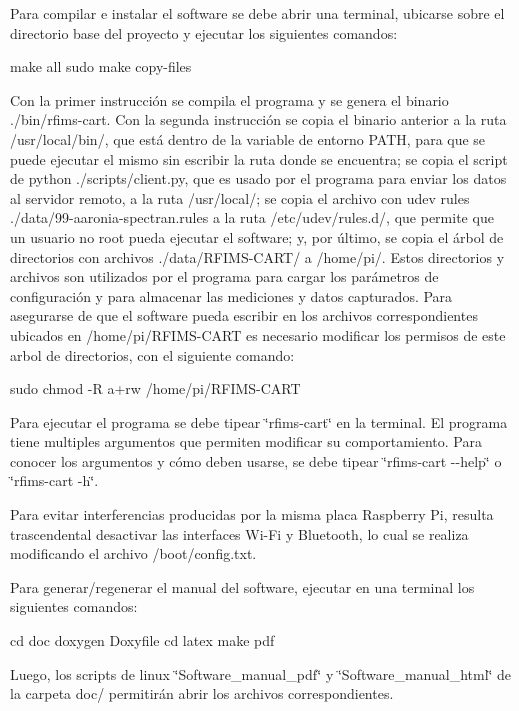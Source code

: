 Para compilar e instalar el software se debe abrir una terminal, ubicarse sobre el directorio base del proyecto y ejecutar los siguientes comandos\+: \begin{DoxyVerb}make all
sudo make copy-files
\end{DoxyVerb}


Con la primer instrucción se compila el programa y se genera el binario ./bin/rfims-\/cart. Con la segunda instrucción se copia el binario anterior a la ruta /usr/local/bin/, que está dentro de la variable de entorno P\+A\+TH, para que se puede ejecutar el mismo sin escribir la ruta donde se encuentra; se copia el script de python ./scripts/client.py, que es usado por el programa para enviar los datos al servidor remoto, a la ruta /usr/local/; se copia el archivo con udev rules ./data/99-\/aaronia-\/spectran.rules a la ruta /etc/udev/rules.d/, que permite que un usuario no root pueda ejecutar el software; y, por último, se copia el árbol de directorios con archivos ./data/\+R\+F\+I\+M\+S-\/\+C\+A\+R\+T/ a /home/pi/. Estos directorios y archivos son utilizados por el programa para cargar los parámetros de configuración y para almacenar las mediciones y datos capturados. Para asegurarse de que el software pueda escribir en los archivos correspondientes ubicados en /home/pi/\+R\+F\+I\+M\+S-\/\+C\+A\+RT es necesario modificar los permisos de este arbol de directorios, con el siguiente comando\+: \begin{DoxyVerb}sudo chmod -R a+rw /home/pi/RFIMS-CART
\end{DoxyVerb}


Para ejecutar el programa se debe tipear \char`\"{}rfims-\/cart\char`\"{} en la terminal. El programa tiene multiples argumentos que permiten modificar su comportamiento. Para conocer los argumentos y cómo deben usarse, se debe tipear \char`\"{}rfims-\/cart -\/-\/help\char`\"{} o \char`\"{}rfims-\/cart -\/h\char`\"{}.

Para evitar interferencias producidas por la misma placa Raspberry Pi, resulta trascendental desactivar las interfaces Wi-\/\+Fi y Bluetooth, lo cual se realiza modificando el archivo /boot/config.txt.

Para generar/regenerar el manual del software, ejecutar en una terminal los siguientes comandos\+: \begin{DoxyVerb}cd doc
doxygen Doxyfile
cd latex
make pdf
\end{DoxyVerb}


Luego, los scripts de linux \char`\"{}\+Software\+\_\+manual\+\_\+pdf\char`\"{} y \char`\"{}\+Software\+\_\+manual\+\_\+html\char`\"{} de la carpeta doc/ permitirán abrir los archivos correspondientes. 